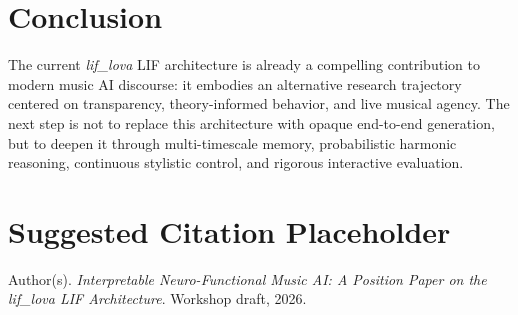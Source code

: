 \documentclass[11pt,a4paper]{article}
\begin{document}
\section{Conclusion}

The current \textit{lif\_lova} LIF architecture is already a compelling contribution to modern music AI discourse:
it embodies an alternative research trajectory centered on transparency, theory-informed behavior,
and live musical agency. The next step is not to replace this architecture with opaque end-to-end generation,
but to deepen it through multi-timescale memory, probabilistic harmonic reasoning,
continuous stylistic control, and rigorous interactive evaluation.

\section*{Suggested Citation Placeholder}

Author(s). \emph{Interpretable Neuro-Functional Music AI: A Position Paper on the lif\_lova LIF Architecture}.
Workshop draft, 2026.
\end{document}
